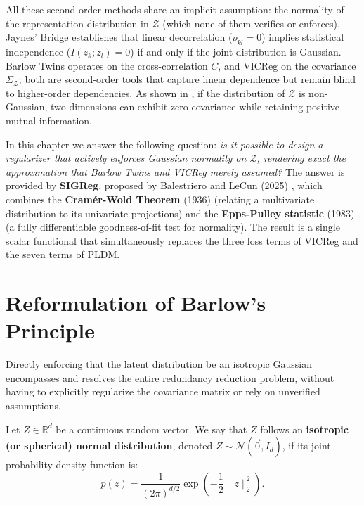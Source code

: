 \documentclass[11pt, oneside, openany]{book}
\begin{document}
All these second-order methods share an implicit assumption: the normality of the representation distribution in $\mathcal{Z}$ (which none of them verifies or enforces). Jaynes' Bridge establishes that linear decorrelation ($\rho_{kl} = 0$) implies statistical independence ($I(z_{k}; z_{l}) = 0$) if and only if the joint distribution is Gaussian. Barlow Twins operates on the cross-correlation $C$, and VICReg on the covariance $\Sigma_{\mathcal{Z}}$; both are second-order tools that capture linear dependence but remain blind to higher-order dependencies. As shown in , if the distribution of $\mathcal{Z}$ is non-Gaussian, two dimensions can exhibit zero covariance while retaining positive mutual information.

In this chapter we answer the following question: \textit{is it possible to design a regularizer that actively enforces Gaussian normality on $\mathcal{Z}$, rendering exact the approximation that Barlow Twins and VICReg merely assumed?} The answer is provided by \textbf{SIGReg}, proposed by Balestriero and LeCun (2025) \cite{balestriero2025lejepa}, which combines the \textbf{Cram\'er-Wold Theorem} (1936) \cite{cramer1936some} (relating a multivariate distribution to its univariate projections) and the \textbf{Epps-Pulley statistic} (1983) \cite{epps1983test} (a fully differentiable goodness-of-fit test for normality). The result is a single scalar functional that simultaneously replaces the three loss terms of VICReg and the seven terms of PLDM.

\section{Reformulation of Barlow's Principle}
\label{sec:7.1}

Directly enforcing that the latent distribution be an isotropic Gaussian encompasses and resolves the entire redundancy reduction problem, without having to explicitly regularize the covariance matrix or rely on unverified assumptions.

\begin{definition}
\label{def:7.1}
Let $Z \in \mathbb{R}^{d}$ be a continuous random vector. We say that $Z$ follows an \textbf{isotropic (or spherical) normal distribution}, denoted $Z \sim \mathcal{N}(\vec{0}, I_{d})$, if its joint probability density function is:
\begin{equation}
\label{eq:7.1}
p(z) = \frac{1}{(2\pi)^{d/2}} \exp\left( -\frac{1}{2} \lVert z \rVert_{2}^{2} \right).
\end{equation}
\end{definition}
\end{document}
